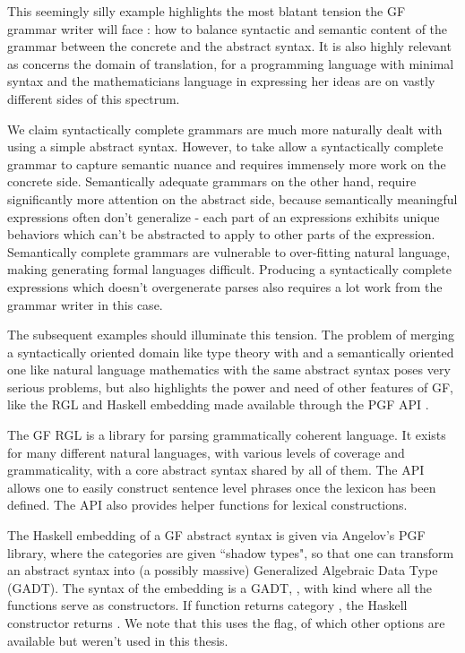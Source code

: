 This seemingly silly example highlights the most blatant tension the GF grammar
writer will face : how to balance syntactic and semantic content of the grammar
between the concrete and the abstract syntax. It is also highly
relevant as concerns the domain of translation, for a programming language
with minimal syntax and the mathematicians language in expressing her ideas are
on vastly different sides of this spectrum.

We claim syntactically complete grammars are much more naturally dealt with
using a simple abstract syntax. However, to take allow a syntactically complete
grammar to capture semantic nuance and requires immensely more work on the
concrete side. Semantically adequate grammars on the other hand, require
significantly more attention on the abstract side, because semantically
meaningful expressions often don't generalize - each part of an expressions
exhibits unique behaviors which can't be abstracted to apply to other parts of
the expression. Semantically complete grammars are vulnerable to over-fitting
natural language, making generating formal languages difficult. Producing a
syntactically complete expressions which doesn't overgenerate parses also
requires a lot work from the grammar writer in this case.

The subsequent examples should illuminate this tension. The problem of
merging a syntactically oriented domain like type theory with and a semantically
oriented one like natural language mathematics with the same abstract syntax poses very serious
problems, but also highlights the power and need of other features of GF, like the RGL 
and Haskell embedding made available through the PGF API \cite{angelovApi}.

The GF RGL is a library for parsing grammatically coherent language. It exists
for many different natural languages, with various levels of coverage and
grammaticality, with a core abstract syntax shared by all of them. The API allows
one to easily construct sentence level phrases once the lexicon has been
defined. The API also provides helper functions for lexical constructions.

The Haskell embedding of a GF abstract syntax is given via Angelov's PGF
library, where the categories are given ``shadow types", so that one can
transform an abstract syntax into (a possibly massive) Generalized Algebraic
Data Type (GADT). The syntax of the embedding is a GADT, , with kind
\codeword{* -> *} where all the functions serve as constructors. If function
 returns category , the Haskell constructor
 returns . We note that this uses the
 flag, of which other options are available but weren't
used in this thesis.

